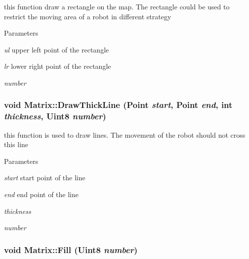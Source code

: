 this function draw a rectangle on the map. The rectangle could be used to restrict the moving area of a robot in different strategy 


\begin{DoxyParams}{Parameters}
\item[{\em ul}]upper left point of the rectangle \item[{\em lr}]lower right point of the rectangle \item[{\em number}]\end{DoxyParams}
\hypertarget{classMatrix_a8aecf2d42e65b27f051c8af79aeeb467}{
\subsubsection[{DrawThickLine}]{\setlength{\rightskip}{0pt plus 5cm}void Matrix::DrawThickLine ({\bf Point} {\em start}, \/  {\bf Point} {\em end}, \/  int {\em thickness}, \/  Uint8 {\em number})}}
\label{classMatrix_a8aecf2d42e65b27f051c8af79aeeb467}


this function is used to draw lines. The movement of the robot should not cross this line 


\begin{DoxyParams}{Parameters}
\item[{\em start}]start point of the line \item[{\em end}]end point of the line \item[{\em thickness}]\item[{\em number}]\end{DoxyParams}
\hypertarget{classMatrix_a4a7c3875be94e94786db920c441973e6}{
\subsubsection[{Fill}]{\setlength{\rightskip}{0pt plus 5cm}void Matrix::Fill (Uint8 {\em number})}}
\label{classMatrix_a4a7c3875be94e94786db920c441973e6}

